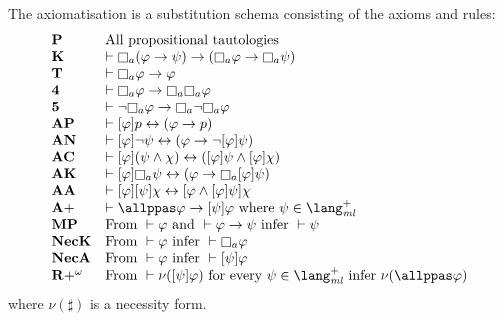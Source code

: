 \begin{definition}
The axiomatisation \axiomPapalS{} is a substitution schema consisting of the axioms and rules:
$$
\begin{array}{ll}
    {\bf P} & \text{All propositional tautologies}\\
    {\bf K} & \proves \knows[\agentA] (\phi \implies \psi) \implies (\knows[\agentA] \phi \implies \knows[\agentA] \psi)\\
    {\bf T} & \proves \knows[\agentA] \phi \implies \phi\\
    {\bf 4} & \proves \knows[\agentA] \phi \implies \knows[\agentA] \knows[\agentA] \phi\\
    {\bf 5} & \proves \neg \knows[\agentA] \phi \implies \knows[\agentA] \neg \knows[\agentA] \phi\\
    {\bf AP} & \proves \announceA{\phi} \atomP \iff (\phi \implies \atomP)\\
    {\bf AN} & \proves \announceA{\phi} \neg \psi \iff (\phi \implies \neg \announceA{\phi} \psi)\\
    {\bf AC} & \proves \announceA{\phi} (\psi \land \chi) \iff (\announceA{\phi} \psi \land \announceA{\phi} \chi)\\
    {\bf AK} & \proves \announceA{\phi} \knows[\agentA] \psi \iff (\phi \implies \knows[\agentA] \announceA{\phi} \psi)\\
    {\bf AA} & \proves \announceA{\phi} \announceA{\psi} \chi \iff \announceA{\phi \land \announceA{\phi} \psi} \chi\\
    {\bf A+} & \proves \allppas \phi \implies \announceA{\psi} \phi \text{ where } \psi \in \langMlPlus\\
    {\bf MP} & \text{From } \proves \phi \text{ and } \proves \phi \implies \psi \text{ infer } \proves \psi\\
    {\bf NecK} & \text{From } \proves \phi \text{ infer } \proves \knows[\agentA] \phi\\
    {\bf NecA} & \text{From } \proves \phi \text{ infer } \proves \announceA{\psi} \phi\\
    {\bf R+^\omega} &\text{From } \proves \nu(\announceA{\psi} \phi) \text{ for every } \psi \in \langMlPlus \text{ infer } \nu(\allppas \phi)    \end{array}
$$
where $\nu(\sharp)$ is a necessity form.
\end{definition}

